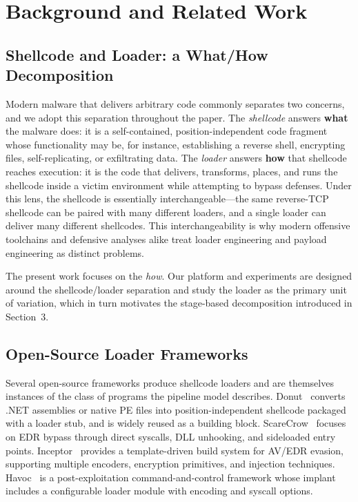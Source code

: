 \section{Background and Related Work}

\subsection{Shellcode and Loader: a What/How Decomposition}

Modern malware that delivers arbitrary code commonly separates two concerns, and we adopt this separation throughout the paper.
The \textit{shellcode} answers \textbf{what} the malware does: it is a self-contained, position-independent code fragment whose functionality may be, for instance, establishing a reverse shell, encrypting files, self-replicating, or exfiltrating data.
The \textit{loader} answers \textbf{how} that shellcode reaches execution: it is the code that delivers, transforms, places, and runs the shellcode inside a victim environment while attempting to bypass defenses.
Under this lens, the shellcode is essentially interchangeable---the same reverse-TCP shellcode can be paired with many different loaders, and a single loader can deliver many different shellcodes.
This interchangeability is why modern offensive toolchains and defensive analyses alike treat loader engineering and payload engineering as distinct problems.

The present work focuses on the \textit{how}.
Our platform and experiments are designed around the shellcode/loader separation and study the loader as the primary unit of variation, which in turn motivates the stage-based decomposition introduced in Section~3.

\subsection{Open-Source Loader Frameworks}

Several open-source frameworks produce shellcode loaders and are themselves instances of the class of programs the pipeline model describes.
Donut~\cite{donut} converts .NET assemblies or native PE files into position-independent shellcode packaged with a loader stub, and is widely reused as a building block.
ScareCrow~\cite{scarecrow} focuses on EDR bypass through direct syscalls, DLL unhooking, and sideloaded entry points.
Inceptor~\cite{inceptor} provides a template-driven build system for AV/EDR evasion, supporting multiple encoders, encryption primitives, and injection techniques.
Havoc~\cite{havoc} is a post-exploitation command-and-control framework whose implant includes a configurable loader module with encoding and syscall options.

